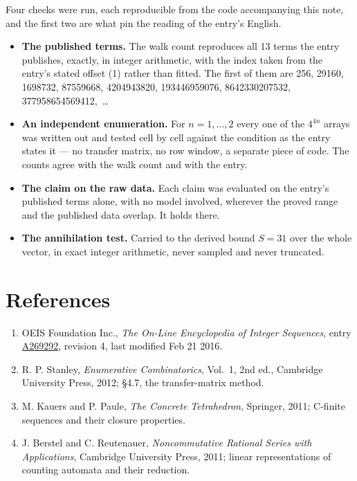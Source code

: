 \documentclass[11pt]{article}
\theoremstyle{definition}
\begin{document}
Four checks were run, each reproducible from the code accompanying this note, and the first two are what pin the reading of the entry's English.

\begin{itemize}

\item {\bfseries The published terms.} The walk count reproduces all 13 terms the entry publishes, exactly, in integer arithmetic, with the index taken from the entry's stated offset (1) rather than fitted. The first of them are 256, 29160, 1698732, 87559668, 4204943820, 193446959076, 8642330207532, 377958654569412,~\dots

\item {\bfseries An independent enumeration.} For $n = 1,\dots,2$ every one of the $4^{4n}$ arrays was written out and tested cell by cell against the condition as the entry states it --- no transfer matrix, no row window, a separate piece of code. The counts agree with the walk count and with the entry.

\item {\bfseries The claim on the raw data.} Each claim was evaluated on the entry's published terms alone, with no model involved, wherever the proved range and the published data overlap. It holds there.

\item {\bfseries The annihilation test.} Carried to the derived bound $S = 31$ over the whole vector, in exact integer arithmetic, never sampled and never truncated.

\end{itemize}

\section{References}

\begin{enumerate}

\item OEIS Foundation Inc., \emph{The On-Line Encyclopedia of Integer Sequences}, entry \href{https://oeis.org/A269292}{A269292}, revision 4, last modified Feb 21 2016.

\item R. P. Stanley, \emph{Enumerative Combinatorics}, Vol.~1, 2nd ed., Cambridge University Press, 2012; \S4.7, the transfer-matrix method.

\item M. Kauers and P. Paule, \emph{The Concrete Tetrahedron}, Springer, 2011; C-finite sequences and their closure properties.

\item J. Berstel and C. Reutenauer, \emph{Noncommutative Rational Series with Applications}, Cambridge University Press, 2011; linear representations of counting automata and their reduction.

\end{enumerate}
\end{document}
